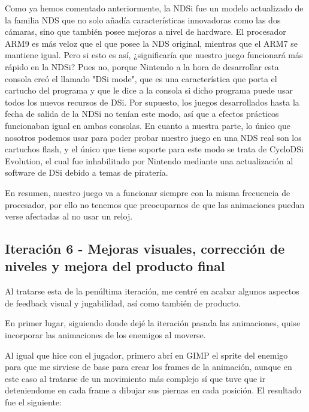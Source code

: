  \vspace{0.5cm}

Como ya hemos comentado anteriormente, la NDSi fue un modelo actualizado de la familia NDS que no solo añadía características innovadoras como las dos cámaras, sino que también posee mejoras a nivel de hardware. El procesador ARM9 es más veloz que el que posee la NDS original, mientras que el ARM7 se mantiene igual. Pero si esto es así, ¿significaría que nuestro juego funcionará más rápido en la NDSi? Pues no, porque Nintendo a la hora de desarrollar esta consola creó el llamado "DSi mode", que es una característica que porta el cartucho del programa y que le dice a la consola si dicho programa puede usar todos los nuevos recursos de DSi. Por supuesto, los juegos desarrollados hasta la fecha de salida de la NDSi no tenían este modo, así que a efectos prácticos funcionaban igual en ambas consolas. En cuanto a nuestra parte, lo único que nosotros podemos usar para poder probar nuestro juego en una NDS real son los cartuchos flash, y el único que tiene soporte para este modo se trata de CycloDSi Evolution, el cual fue inhabilitado por Nintendo mediante una actualización al software de DSi debido a temas de piratería.

 \vspace{0.5cm}

En resumen, nuestro juego va a funcionar siempre con la misma frecuencia de procesador, por ello no tenemos que preocuparnos de que las animaciones puedan verse afectadas al no usar un reloj.

\vspace{1cm}

\subsection{Iteración 6 - Mejoras visuales, corrección de niveles y mejora del producto final}

Al tratarse esta de la penúltima iteración, me centré en acabar algunos aspectos de feedback visual y jugabilidad, así como también de producto.

 \vspace{0.5cm}

En primer lugar, siguiendo donde dejé la iteración pasada las animaciones, quise incorporar las animaciones de los enemigos al moverse. 

 \vspace{0.5cm}

Al igual que hice con el jugador, primero abrí en GIMP el sprite del enemigo para que me sirviese de base para crear los frames de la animación, aunque en este caso al tratarse de un movimiento más complejo sí que tuve que ir deteniendome en cada frame a dibujar sus piernas en cada posición. El resultado fue el siguiente:

